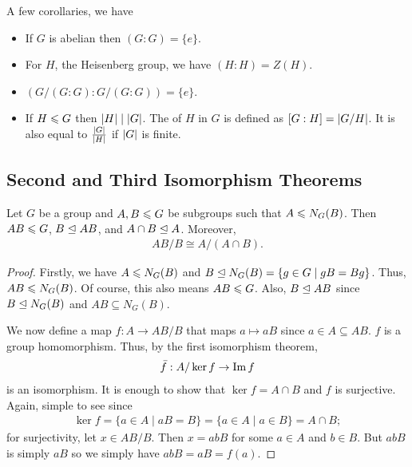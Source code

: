 \begin{remark}
    A few corollaries, we have
    \begin{itemize}
        \item If $G$ is abelian then $(G:G) = \{e\}$.
        \item For $H$, the Heisenberg group, we have $(H:H) = Z(H)$.
        \item $(G/(G:G):G/(G:G)) = \{e\}$.
        \item If $H \leqslant G$ then $\left| H \right| \mid \left| G \right|$. The  of $H$ in $G$ is defined as $[G:H] = \left| G/H \right|$. It is also equal to $\frac{\left| G \right|}{\left| H \right|}$ if $\left| G \right|$ is finite.
    \end{itemize}
\end{remark}


\subsection{Second and Third Isomorphism Theorems}

\begin{theorem}
    Let $G$ be a group and $A,B \leqslant G$ be subgroups such that $A \leqslant N_{G}(B)$. Then $AB \leqslant G$, $B \trianglelefteq AB$, and $A \cap B \trianglelefteq A$. Moreover,
    \begin{align}
        AB/B \cong A/(A \cap B).
    \end{align}
\end{theorem}

\begin{proof}
    Firstly, we have $A \leqslant N_{G}(B)$ and $B \trianglelefteq N_{G}(B) = \{g \in G \mid gB = Bg\}$. Thus, $AB \leqslant N_{G}(B)$. Of course, this also means $AB \leqslant G$. Also, $B \trianglelefteq AB$ since $B \trianglelefteq N_{G}(B)$ and $AB \subseteq N_{G}(B)$.

    We now define a map $f:A \to AB/B$ that maps $a \mapsto aB$ since $a \in A \subseteq AB$. $f$ is a group homomorphism. Thus, by the first isomorphism theorem,
    \begin{align}
        \bar{f} : A/\ker f \to \operatorname{Im} f
    \end{align}
    is an isomorphism. It is enough to show that $\ker f = A \cap B$ and $f$ is surjective. Again, simple to see since
    \begin{align}
        \ker f = \{a \in A \mid aB = B\} = \{a \in A \mid a \in B\} = A \cap B;
    \end{align}
    for surjectivity, let $x \in AB/B$. Then $x = abB$ for some $a \in A$ and $b \in B$. But $abB$ is simply $aB$ so we simply have $abB = aB = f(a)$.
\end{proof}

